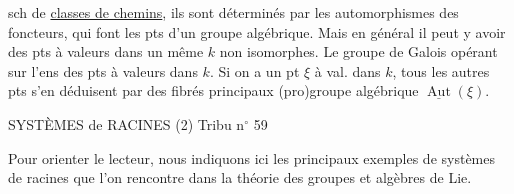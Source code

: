 sch de \uline{classes de chemins}, ils sont déterminés  par les automorphismes des foncteurs, qui font les pts d'un groupe algébrique.
Mais en général il peut y avoir des pts à valeurs dans un même $k$ non isomorphes.
Le groupe de Galois opérant sur  l'ens des pts à valeurs dans $k$.
Si on a un pt $\xi$ à val. dans $k$, tous les autres pts s'en déduisent par des fibrés principaux   (pro)groupe algébrique $\underline{\operatorname{Aut}}(\xi)$.


SYSTÈMES de RACINES (2) \hfill Tribu n$^\circ$ 59

Pour orienter le lecteur, nous indiquons ici les principaux exemples de systèmes de racines que l'on rencontre dans la théorie des groupes et algèbres de Lie.

